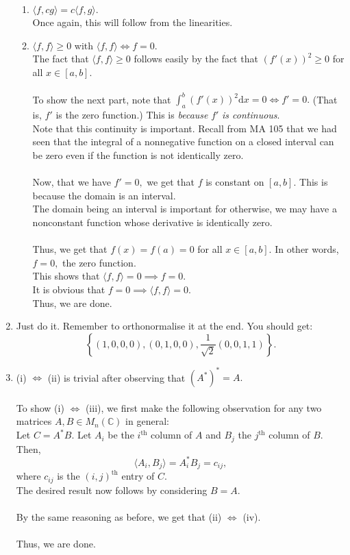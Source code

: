 \documentclass{article}
\begin{document}
\begin{enumerate}
\begin{enumerate}[nosep]
		\item $\langle f, cg\rangle = c\langle f, g\rangle.$\\
		Once again, this will follow from the linearities.
		\item $\langle f, f\rangle \ge 0$ with $\langle f, f\rangle \iff f = 0.$\\
		The fact that $\langle f, f\rangle \ge 0$ follows easily by the fact that $(f'(x))^2 \ge 0$ for all $x \in [a, b].$\\~\\
		To show the next part, note that $\displaystyle\int_{a}^{b} (f'(x))^2 \text{d}x = 0 \iff f' = 0.$ (That is, $f'$ is the zero function.) This is \emph{because} $f'$ \emph{is continuous}. \\
		Note that this continuity is important. Recall from MA 105 that we had seen that the integral of a nonnegative function on a closed interval can be zero even if the function is not identically zero. \\~\\
		Now, that we have $f' = 0,$ we get that $f$ is constant on $[a, b].$ This is because the domain is an interval.\\
		The domain being an interval is important for otherwise, we may have a nonconstant function whose derivative is identically zero.\\~\\
		Thus, we get that $f(x) = f(a) = 0$ for all $x \in [a, b].$ In other words, $f = 0,$ the zero function.\\
		This shows that $\langle f, f\rangle = 0 \implies f = 0.$\\
		It is obvious that $f = 0 \implies \langle f, f\rangle = 0.$\\
		Thus, we are done.
	\end{enumerate}
	\item Just do it. Remember to orthonormalise it at the end. You should get:
	\[\left\{(1, 0, 0, 0), (0, 1, 0, 0), \frac{1}{\sqrt{2}}(0, 0, 1, 1)\right\}.\]
	\item (i) $\iff$ (ii) is trivial after observing that $(A^*)^* = A.$\\~\\
	To show (i) $\iff$ (iii), we first make the following observation for any two matrices $A, B \in M_n(\mathbb{C})$ in general:\\
	Let $C = A^*B.$ Let $A_i$ be the $i^{\text{th}}$ column of $A$ and $B_j$ the $j^{\text{th}}$ column of $B.$ Then,
	\[\langle A_i, B_j\rangle = A_i^*B_j = c_{ij},\]
	where $c_{ij}$ is the $(i, j)^{\text{th}}$ entry of $C.$\\
	The desired result now follows by considering $B = A.$\\~\\
	By the same reasoning as before, we get that (ii) $\iff$ (iv).\\~\\
	Thus, we are done.
\end{enumerate}
\end{document}
